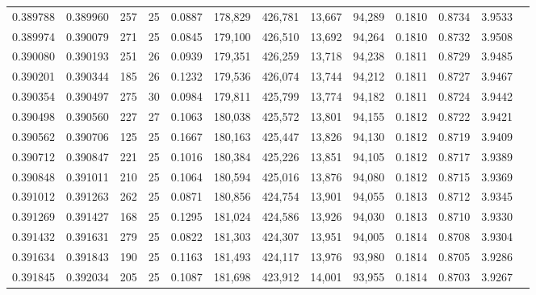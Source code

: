 \begin{tabular}{rrrrrrrrrrrrr}
0.389788 & 0.389960 & 257 &  25 &                                     0.0887 & 178,829 & 426,781 &  13,667 &  94,289 & 0.1810 & 0.8734 & 3.9533 \\
0.389974 & 0.390079 & 271 &  25 &                                     0.0845 & 179,100 & 426,510 &  13,692 &  94,264 & 0.1810 & 0.8732 & 3.9508 \\
0.390080 & 0.390193 & 251 &  26 &                                     0.0939 & 179,351 & 426,259 &  13,718 &  94,238 & 0.1811 & 0.8729 & 3.9485 \\
0.390201 & 0.390344 & 185 &  26 &                                     0.1232 & 179,536 & 426,074 &  13,744 &  94,212 & 0.1811 & 0.8727 & 3.9467 \\
0.390354 & 0.390497 & 275 &  30 &                                     0.0984 & 179,811 & 425,799 &  13,774 &  94,182 & 0.1811 & 0.8724 & 3.9442 \\
0.390498 & 0.390560 & 227 &  27 &                                     0.1063 & 180,038 & 425,572 &  13,801 &  94,155 & 0.1812 & 0.8722 & 3.9421 \\
0.390562 & 0.390706 & 125 &  25 &                                     0.1667 & 180,163 & 425,447 &  13,826 &  94,130 & 0.1812 & 0.8719 & 3.9409 \\
0.390712 & 0.390847 & 221 &  25 &                                     0.1016 & 180,384 & 425,226 &  13,851 &  94,105 & 0.1812 & 0.8717 & 3.9389 \\
0.390848 & 0.391011 & 210 &  25 &                                     0.1064 & 180,594 & 425,016 &  13,876 &  94,080 & 0.1812 & 0.8715 & 3.9369 \\
0.391012 & 0.391263 & 262 &  25 &                                     0.0871 & 180,856 & 424,754 &  13,901 &  94,055 & 0.1813 & 0.8712 & 3.9345 \\
0.391269 & 0.391427 & 168 &  25 &                                     0.1295 & 181,024 & 424,586 &  13,926 &  94,030 & 0.1813 & 0.8710 & 3.9330 \\
0.391432 & 0.391631 & 279 &  25 &                                     0.0822 & 181,303 & 424,307 &  13,951 &  94,005 & 0.1814 & 0.8708 & 3.9304 \\
0.391634 & 0.391843 & 190 &  25 &                                     0.1163 & 181,493 & 424,117 &  13,976 &  93,980 & 0.1814 & 0.8705 & 3.9286 \\
0.391845 & 0.392034 & 205 &  25 &                                     0.1087 & 181,698 & 423,912 &  14,001 &  93,955 & 0.1814 & 0.8703 & 3.9267 \\

\end{tabular}

